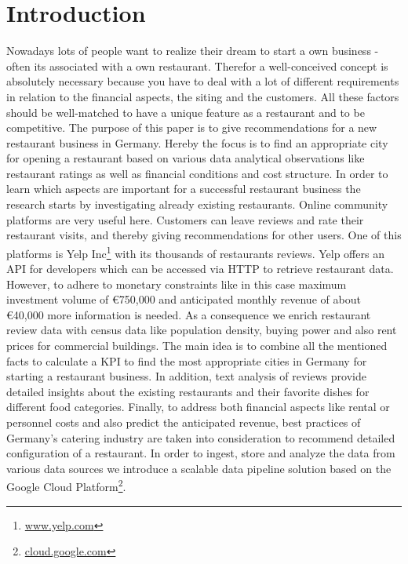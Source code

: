 \section{Introduction}
\label{sec:introduction}
Nowadays lots of people want to realize their dream to start a own business - often its associated with a own restaurant. Therefor a well-conceived concept is absolutely necessary because you have to deal with a lot of different requirements in relation to the financial aspects, the siting and the customers. All these factors should be well-matched to have a unique feature as a restaurant and to be competitive. \newline
The purpose of this paper is to give recommendations for a new restaurant business in Germany. Hereby the focus is to find an appropriate city for opening a restaurant based on various data analytical observations like restaurant ratings as well as financial conditions and cost structure.
In order to learn which aspects are important for a successful restaurant business the research starts by investigating already existing restaurants. Online community platforms are very useful here. Customers can leave reviews and rate their restaurant visits, and thereby giving recommendations for other users. One of this platforms is Yelp Inc\footnote{\href{https://www.yelp.com/}{www.yelp.com}} with its thousands of restaurants reviews. Yelp offers an \ac{API} for developers which can be accessed via HTTP to retrieve restaurant data. However, to adhere to monetary constraints like in this case maximum investment volume of \euro{750,000} and anticipated monthly revenue of about \euro{40,000} more information is needed. As a consequence we enrich restaurant review data with census data like population density, buying power and also rent prices for commercial buildings. The main idea is to combine all the mentioned facts to calculate a \ac{KPI} to find the most appropriate cities in Germany for starting a restaurant business. In addition, text analysis of reviews provide detailed insights about the existing restaurants and their favorite dishes for different food categories. Finally, to address both financial aspects like rental or personnel costs and also predict the anticipated revenue, best practices of Germany's catering industry are taken into consideration to recommend detailed configuration of a restaurant. In order to ingest, store and analyze the data from various data sources we introduce a scalable data pipeline solution based on the Google Cloud Platform\footnote{\href{https://cloud.google.com/}{cloud.google.com}}.

